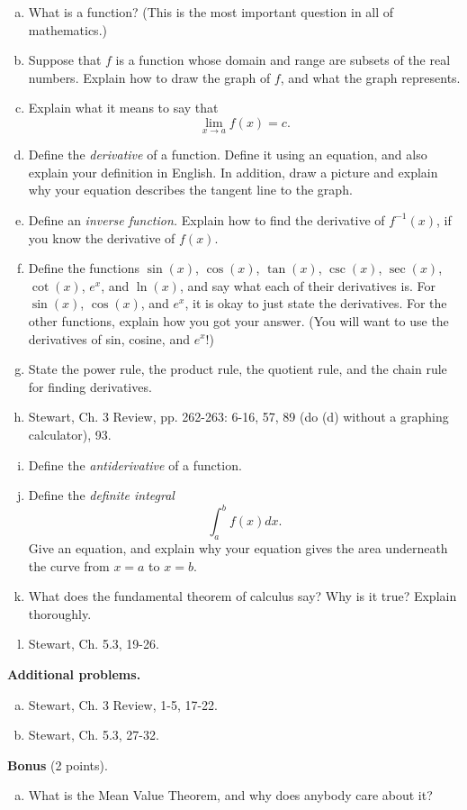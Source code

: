 \documentclass[12pt]{article}
\begin{document}
\begin{enumerate}[(a)]
\item
What is a function? (This is the most important question in all of mathematics.)

\item
Suppose that $f$ is a function whose domain and range are subsets of the real numbers.
Explain how to draw the graph of $f$, and what the graph represents.

\item
Explain what it means to say that
$$\lim_{x \rightarrow a} f(x) = c.$$

\item
Define the {\itshape derivative} of a function. Define it using an equation, and also explain
your definition in English. In addition, draw a picture and explain why your equation describes
the tangent line to the graph.

\item
Define an {\itshape inverse function.}
Explain how to find the derivative of $f^{-1}(x)$, if you know the derivative of $f(x)$.

\item
Define the functions $\sin(x)$, $\cos(x)$, $\tan(x)$, $\csc(x)$, $\sec(x)$, $\cot(x)$, $e^x$, and
$\ln(x)$, and say what each of their derivatives is. For $\sin(x)$, $\cos(x)$, and $e^x$, it is okay
to just state the derivatives. For the other functions, explain how you got your answer. (You will want
to use the derivatives of sin, cosine, and $e^x$!)

\item
State the power rule, the product rule, the quotient rule, and the chain rule for finding derivatives.

\item
Stewart, Ch. 3 Review, pp. 262-263: 6-16, 57, 89 (do (d) without a graphing calculator),
93.

\item
Define the {\itshape antiderivative} of a function.

\item
Define the {\itshape definite integral}
$$\int_a^b f(x) dx.$$
Give an equation, and explain why your equation gives the area underneath the curve from $x = a$
to $x =b$.

\item
What does the fundamental theorem of calculus say? Why is it true? Explain thoroughly.

\item
Stewart, Ch. 5.3, 19-26.

\end{enumerate}
{\bf Additional problems.}
\begin{enumerate}[(a)]
\item
Stewart, Ch. 3 Review, 1-5, 17-22.

\item
Stewart, Ch. 5.3, 27-32.

\end{enumerate}
{\bf Bonus} (2 points).
\begin{enumerate}[(a)]
\item
What is the Mean Value Theorem, and why does anybody care about it?

\end{enumerate}
\end{document}
